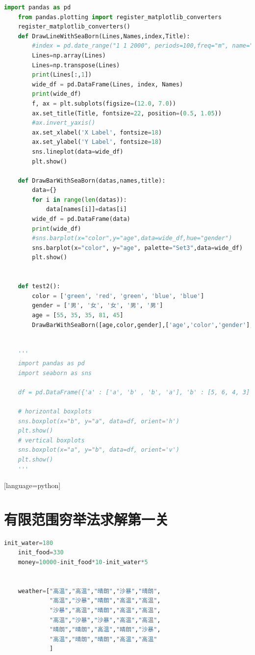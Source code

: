 \documentclass[withoutpreface,bwprint]{cumcmthesis} %
\begin{document}
\begin{appendices}
\begin{lstlisting}[language=python]
    import pandas as pd
    from pandas.plotting import register_matplotlib_converters
    register_matplotlib_converters()
    def DrawLineWithSeaBorn(Lines,Names,index,Title):
        #index = pd.date_range("1 1 2000", periods=100,freq="m", name="date")
        Lines=np.array(Lines)
        Lines=np.transpose(Lines)
        print(Lines[:,1])
        wide_df = pd.DataFrame(Lines, index, Names)
        print(wide_df)
        f, ax = plt.subplots(figsize=(12.0, 7.0))
        ax.set_title(Title, fontsize=22, position=(0.5, 1.05))
        #ax.invert_yaxis()
        ax.set_xlabel('X Label', fontsize=18)
        ax.set_ylabel('Y Label', fontsize=18)
        sns.lineplot(data=wide_df)
        plt.show()
    
    def DrawBarWithSeaBorn(datas,names,title):
        data={}
        for i in range(len(datas)):
            data[names[i]]=datas[i]
        wide_df = pd.DataFrame(data)
        print(wide_df)
        #sns.barplot(x="color",y="age",data=wide_df,hue="gender")
        sns.barplot(x="color", y="age", palette="Set3",data=wide_df)
        plt.show()
    
    
    def test2():
        color = ['green', 'red', 'green', 'blue', 'blue']
        gender = ['男', '女', '女', '男', '男']
        age = [55, 35, 35, 81, 45]
        DrawBarWithSeaBorn([age,color,gender],['age','color','gender'],"Test")
    
    
    '''
    import pandas as pd
    import seaborn as sns
    
    df = pd.DataFrame({'a' : ['a', 'b' , 'b', 'a'], 'b' : [5, 6, 4, 3] })
    
    # horizontal boxplots
    sns.boxplot(x="b", y="a", data=df, orient='h')
    plt.show()
    # vertical boxplots
    sns.boxplot(x="a", y="b", data=df, orient='v')
    plt.show()
    '''
\end{lstlisting}[language=python]

\section{有限范围穷举法求解第一关}
\begin{lstlisting}[language=python]
    init_water=180
    init_food=330
    money=10000-init_food*10-init_water*5
    
    
    weather=["高温","高温","晴朗","沙暴","晴朗",
             "高温","沙暴","晴朗","高温","高温",
             "沙暴","高温","晴朗","高温","高温",
             "高温","沙暴","沙暴","高温","高温",
             "晴朗","晴朗","高温","晴朗","沙暴",
             "高温","晴朗","晴朗","高温","高温"
             ]
    

\end{lstlisting}
\end{appendices}
\end{document}
